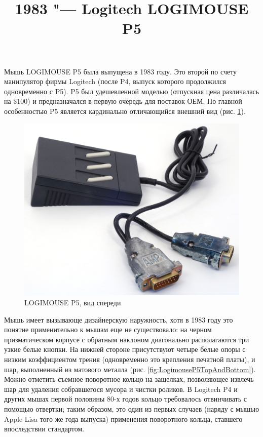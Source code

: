 \documentclass[11pt, a4paper]{article}
\begin{document}
\title{1983 "--- Logitech LOGIMOUSE P5}
\date{}
\maketitle
{}
Мышь LOGIMOUSE P5 была выпущена в 1983 году. Это второй по счету манипулятор фирмы Logitech (после P4, выпуск которого продолжился одновременно с P5). P5 был удешевленной моделью (отпускная цена различалась на \$100) и предназначался в первую очередь для поставок ОЕМ.
Но главной особенностью P5 является кардинально отличающийся внешний вид (рис. \ref{fig:LogimouseP5Pic}). 

\begin{figure}[h]
   \centering
    \includegraphics[scale=0.35]{1983_logitech_logimouse_p5/pic_30.jpg}
    \caption{LOGIMOUSE P5, вид спереди}
    \label{fig:LogimouseP5Pic}
\end{figure}

Мышь имеет вызывающе дизайнерскую наружность, хотя в 1983 году это понятие применительно к мышам еще не существовало: на черном призматическом корпусе с обратным наклоном диагонально располагаются три узкие белые кнопки. На нижней стороне присутствуют четыре белые опоры с низким коэффициентом трения (одновременно это крепления печатной платы), и шар, выполненный из матового металла (рис. \ref{fig:LogimouseP5TopAndBottom}). Можно отметить съемное поворотное кольцо на защелках, позволяющее извлечь шар для удаления собравшегося мусора и чистки роликов. В Logitech P4 и других мышах первой половины 80-х годов кольцо требовалось отвинчивать с помощью отвертки; таким образом, это один из первых случаев (наряду с мышью Apple Lisa того же года выпуска) применения поворотного кольца, ставшего впоследствии стандартом.
\end{document}

